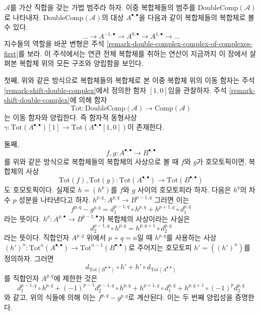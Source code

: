 \begin{remark}
\label{remark-double-complex-complex-of-complexes-second}
$\mathcal{A}$를 가산 직합을 갖는 가법 범주라 하자.
이중 복합체들의 범주를 $\text{DoubleComp}(\mathcal{A})$로 나타내자.
$\text{DoubleComp}(\mathcal{A})$의 대상 $A^{\bullet, \bullet}$을
다음과 같이 복합체들의 복합체로 볼 수 있다.
$$
\ldots \to A^{-1, \bullet} \to A^{0, \bullet} \to A^{1, \bullet} \to \ldots
$$
지수들의 역할을 바꾼 변형은 주석
\ref{remark-double-complex-complex-of-complexes-first}를 보라.
이 주석에서는 연관 전체 복합체를 취하는 연산이 지금까지 이 장에서
살펴본 복합체 위의 모든 구조와 양립함을 보인다.

\medskip\noindent
첫째, 위와 같은 방식으로 복합체들의 복합체로 본 이중 복합체 위의
이동 함자는 주석 \ref{remark-shift-double-complex}에서 정의한 함자
$[1, 0]$임을 관찰하자. 주석 \ref{remark-shift-double-complex}에 의해
함자
$$
\text{Tot} : \text{DoubleComp}(\mathcal{A}) \to \text{Comp}(\mathcal{A})
$$
는 이동 함자와 양립한다. 즉 함자적 동형사상
$\gamma : \text{Tot}(A^{\bullet, \bullet})[1] \to
\text{Tot}(A^{\bullet, \bullet}[1, 0])$이 존재한다.

\medskip\noindent
둘째,
$$
f, g : A^{\bullet, \bullet} \to B^{\bullet, \bullet}
$$
를 위와 같은 방식으로 복합체들의 복합체의 사상으로 볼 때
$f$와 $g$가 호모토픽이면, 복합체의 사상
$$
\text{Tot}(f), \text{Tot}(g) :
\text{Tot}(A^{\bullet, \bullet}) \to \text{Tot}(B^{\bullet, \bullet})
$$
도 호모토픽이다. 실제로 $h = (h^p)$를 $f$와 $g$ 사이의 호모토피라
하자. 다음은 $h^q$의 차수 $p$ 성분을 나타낸다고 하자.
$h^{p, q} : A^{p, q} \to B^{p - 1, q}$
그러면 이는
$$
f^{p, q} - g^{p, q} = d_1^{p - 1, q} \circ h^{p, q} +
h^{p + 1, q} \circ d_1^{p, q}
$$
라는 뜻이다. $h^p : A^{p, \bullet} \to B^{p - 1, \bullet}$가 복합체의
사상이라는 사실은
$$
d_2^{p - 1, q} \circ h^{p, q} = h^{p, q + 1} \circ d_2^{p, q}
$$
라는 뜻이다. 직합인자 $A^{p, q}$ 위에서 $p + q = n$일 때
$h^{p, q}$를 사용하는 사상
$(h')^n : \text{Tot}^n(A^{\bullet, \bullet}) \to
\text{Tot}^{n - 1}(B^{\bullet, \bullet})$로 주어지는 호모토피
$h' = ((h')^n)$를 정의하자. 그러면
$$
d_{\text{Tot}(B^{\bullet, \bullet})} \circ h' +
h' \circ d_{\text{Tot}(A^{\bullet, \bullet})}
$$
를 직합인자 $A^{p, q}$에 제한한 것은
$$
d_1^{p - 1, q} \circ h^{p, q} +
(-1)^{p - 1} d_2^{p - 1, q} \circ h^{p, q} +
h^{p + 1, q} \circ d_1^{p, q} +
h^{p, q + 1} \circ (-1)^p d_2^{p, q}
$$
와 같고, 위의 식들에 의해 이는 $f^{p, q} - g^{p, q}$로 계산된다.
이는 두 번째 양립성을 증명한다.


\end{remark}
